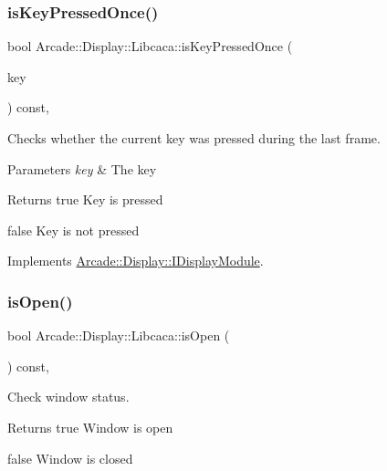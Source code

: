 \subsubsection{\texorpdfstring{isKeyPressedOnce()}{isKeyPressedOnce()}}
{\footnotesize\ttfamily bool Arcade\+::\+Display\+::\+Libcaca\+::is\+Key\+Pressed\+Once (\begin{DoxyParamCaption}\item[{\mbox{\hyperlink{classArcade_1_1Display_1_1IDisplayModule_a8da3f6b309ca0581473ae8cc8789b619}{I\+Display\+Module\+::\+Keys}}}]{key }\end{DoxyParamCaption}) const\hspace{0.3cm}{\ttfamily [final]}, {\ttfamily [virtual]}}



Checks whether the current key was pressed during the last frame. 


\begin{DoxyParams}{Parameters}
{\em key} & The key \\
\hline
\end{DoxyParams}
\begin{DoxyReturn}{Returns}
true Key is pressed 

false Key is not pressed 
\end{DoxyReturn}


Implements \mbox{\hyperlink{classArcade_1_1Display_1_1IDisplayModule_a531b700b332e077d9b714bafac05ebe1}{Arcade\+::\+Display\+::\+I\+Display\+Module}}.

\mbox{\label{classArcade_1_1Display_1_1Libcaca_aae9aa5b1c54a2086c4fa92e7710fc845}} 
\subsubsection{\texorpdfstring{isOpen()}{isOpen()}}
{\footnotesize\ttfamily bool Arcade\+::\+Display\+::\+Libcaca\+::is\+Open (\begin{DoxyParamCaption}{ }\end{DoxyParamCaption}) const\hspace{0.3cm}{\ttfamily [final]}, {\ttfamily [virtual]}}



Check window status. 

\begin{DoxyReturn}{Returns}
true Window is open 

false Window is closed 
\end{DoxyReturn}



